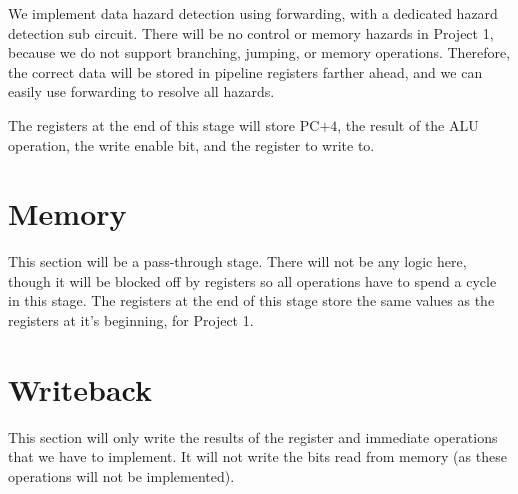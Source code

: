 \documentclass{article}
\begin{document}
We implement data hazard detection using forwarding, with a dedicated hazard detection sub circuit. There will be no control or memory hazards in Project 1, because we do not support branching, jumping, or memory operations. Therefore, the correct data will be stored in pipeline registers farther ahead, and we can easily use forwarding to resolve all hazards. 

The registers at the end of this stage will store PC$+4$, the result of the ALU operation, the write enable bit, and the register to write to.

\section*{Memory}
This section will be a pass-through stage. There will not be any logic here, though it will be blocked off by registers so all operations have to spend a cycle in this stage. The registers at the end of this stage store the same values as the registers at it's beginning, for Project 1. 

\section*{Writeback}
This section will only write the results of the register and immediate operations that we have to implement.  It will not write the bits read from memory (as these operations will not be implemented).
\end{document}
